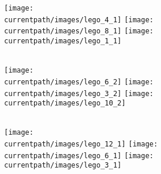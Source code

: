 \begin{activite}
       \partie[]
          \texttt{[image: \\currentpath/images/lego\_4\_1]}
          \hspace{1.3cm}
          \texttt{[image: \\currentpath/images/lego\_8\_1]}
          \hspace{2.7cm}
          \texttt{[image: \\currentpath/images/lego\_1\_1]} \\ [2.5mm]
          \makebox[0.25\linewidth]{\dotfill} \\ [2.5mm]
          \makebox[0.25\linewidth]{\dotfill} \smallskip
          
       \partie[]
          \texttt{[image: \\currentpath/images/lego\_6\_2]}
          \hspace{2.8cm}
          \texttt{[image: \\currentpath/images/lego\_3\_2]}
          \hspace{2.5cm}
          \texttt{[image: \\currentpath/images/lego\_10\_2]} \\ [2.5mm]
          \makebox[0.25\linewidth]{\dotfill} \\ [2.5mm]
          \makebox[0.25\linewidth]{\dotfill} \smallskip
       
       \partie[]
          \texttt{[image: \\currentpath/images/lego\_12\_1]}
          \hspace{0.5cm}
          \texttt{[image: \\currentpath/images/lego\_6\_1]}
          \hspace{2cm}
          \texttt{[image: \\currentpath/images/lego\_3\_1]} \\ [2.5mm]
          \makebox[0.25\linewidth]{\dotfill} \\ [2.5mm]
          \makebox[0.25\linewidth]{\dotfill} \medskip
 \end{activite}
 
 